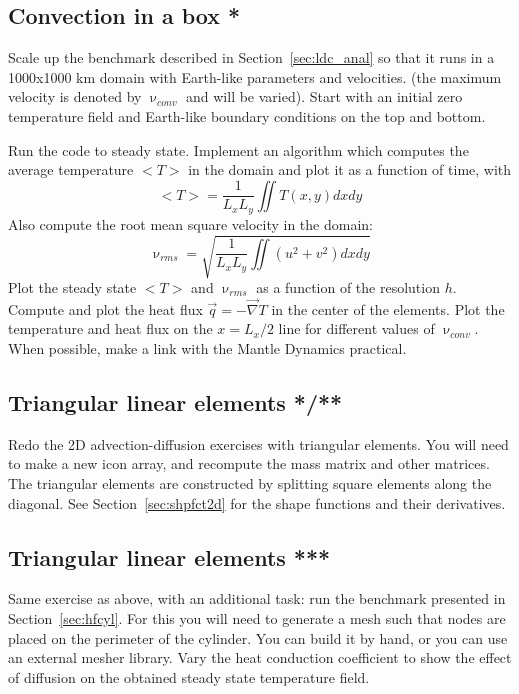 

\subsection{Convection in a box *}

Scale up the benchmark described in Section~\ref{sec:ldc_anal} so that 
it runs in a 1000x1000 km domain with Earth-like parameters and velocities.
(the maximum velocity is denoted by $\upnu_{conv}$ and will be varied).
Start with an initial zero temperature field and Earth-like boundary conditions 
on the top and bottom. 

Run the code to steady state. Implement an algorithm which computes the average 
temperature $<T>$ in the domain and plot it as a function of time, with 
\[
<T> = \frac{1}{L_xL_y} \iint T(x,y) dx dy
\]
Also compute the root mean square velocity in the domain:
\[
\upnu_{rms} = \sqrt{   \frac{1}{L_xL_y} \iint (u^2+v^2) dx dy  }
\]
Plot the steady state $<T>$ and $\upnu_{rms} $ as a function of the resolution $h$. 
Compute and plot the heat flux $\vec{q}=-\vec\nabla T$ in the center of the elements.
Plot the temperature and heat flux on the $x=L_x/2$ line for different values 
of $\upnu_{conv}$.
When possible, make a link with the Mantle Dynamics practical. 

\subsection{Triangular linear elements */**}

Redo the 2D advection-diffusion exercises with triangular elements.
You will need to make a new icon array, and recompute the mass matrix 
and other matrices. The triangular elements are constructed by splitting 
square elements along the diagonal.
See Section~\ref{sec:shpfct2d} for the shape functions and their derivatives. 

\subsection{Triangular linear elements ***}

Same exercise as above, with an additional task: run the benchmark
presented in Section~\ref{sec:hfcyl}.
For this you will need to generate a mesh 
such that nodes are placed on the perimeter of the cylinder. You can build it 
by hand, or you can use an external mesher library.
Vary the heat conduction coefficient to show the effect of diffusion on the obtained
steady state temperature field.  

